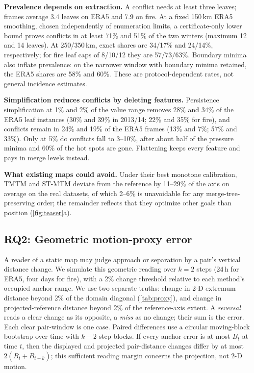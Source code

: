 \documentclass[review]{vgtc}                 %
\begin{document}
\textbf{Prevalence depends on extraction.} A conflict needs at least three leaves; frames average 3.4 leaves on ERA5 and 7.9 on fire. At a fixed 150\,km ERA5 smoothing, chosen independently of enumeration limits, a certificate-only lower bound proves conflicts in at least 71\% and 51\% of the two winters (maximum 12 and 14 leaves). At 250/350\,km, exact shares are 34/17\% and 24/14\%, respectively; for fire leaf caps of 8/10/12 they are 57/73/63\%. Boundary minima also inflate prevalence: on the narrower window with boundary minima retained, the ERA5 shares are 58\% and 60\%. These are protocol-dependent rates, not general incidence estimates.

\textbf{Simplification reduces conflicts by deleting features.} Persistence simplification at 1\% and 2\% of the value range removes 28\% and 34\% of the ERA5 leaf instances (30\% and 39\% in 2013/14; 22\% and 35\% for fire), and conflicts remain in 24\% and 19\% of the ERA5 frames (13\% and 7\%; 57\% and 33\%). Only at 5\% do conflicts fall to 3--10\%, after about half of the pressure minima and 60\% of the hot spots are gone. Flattening keeps every feature and pays in merge levels instead.

\textbf{What existing maps could avoid.} Under their best monotone calibration, TMTM and ST-MTM deviate from the reference by 11--29\% of the axis on average on the real datasets, of which 2--6\% is unavoidable for any merge-tree-preserving order; the remainder reflects that they optimize other goals than position (\cref{fig:teaser}a).

\subsection{RQ2: Geometric motion-proxy error}\label{sec:rq2}
A reader of a static map may judge approach or separation by a pair's vertical distance change. We simulate this geometric reading over $k=2$ steps (24\,h for ERA5, four days for fire), with a 2\% change threshold relative to each method's occupied anchor range. We use two separate truths: change in 2-D extremum distance beyond 2\% of the domain diagonal (\cref{tab:proxy}), and change in projected-reference distance beyond 2\% of the reference-axis extent. A \emph{reversal} reads a clear change as its opposite, a \emph{miss} as no change; their sum is the error. Each clear pair-window is one case. Paired differences use a circular moving-block bootstrap over time with $k+2$-step blocks. If every anchor error is at most $B_t$ at time $t$, then the displayed and projected pair-distance changes differ by at most $2(B_t+B_{t+k})$; this sufficient reading margin concerns the projection, not 2-D motion.
\end{document}
